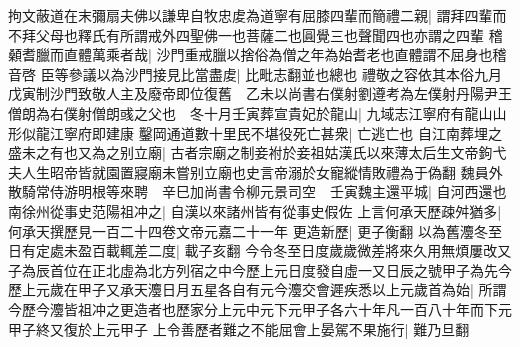 拘文蔽道在末彌扇夫佛以謙卑自牧忠䖍為道寧有屈膝四輩而簡禮二親|{
	謂拜四輩而不拜父母也釋氏有所謂戒外四聖佛一也菩薩二也圓覺三也聲聞四也亦謂之四輩}
稽顙耆臘而直體萬乘者哉|{
	沙門重戒臘以捨俗為僧之年為始耆老也直體謂不屈身也稽音啓}
臣等參議以為沙門接見比當盡䖍|{
	比毗志翻並也總也}
禮敬之容依其本俗九月戊寅制沙門致敬人主及廢帝即位復舊　乙未以尚書右僕射劉遵考為左僕射丹陽尹王僧朗為右僕射僧朗彧之父也　冬十月壬寅葬宣貴妃於龍山|{
	九域志江寧府有龍山山形似龍江寧府即建康}
鑿岡通道數十里民不堪役死亡甚衆|{
	亡逃亡也}
自江南葬埋之盛未之有也又為之别立廟|{
	古者宗廟之制妾袝於妾祖姑漢氏以來薄太后生文帝鉤弋夫人生昭帝皆就園置寢廟未嘗别立廟也史言帝溺於女寵縱情敗禮為于偽翻}
魏員外散騎常侍游明根等來聘　辛巳加尚書令柳元景司空　壬寅魏主還平城|{
	自河西還也}
南徐州從事史范陽祖冲之|{
	自漢以來諸州皆有從事史假佐}
上言何承天歷疎舛猶多|{
	何承天撰歷見一百二十四卷文帝元嘉二十一年}
更造新歷|{
	更子衡翻}
以為舊灋冬至日有定處未盈百載輒差二度|{
	載子亥翻}
今令冬至日度歲歲微差將來久用無煩屢改又子為辰首位在正北虛為北方列宿之中今歷上元日度發自虛一又日辰之號甲子為先今歷上元歲在甲子又承天灋日月五星各自有元今灋交會遲疾悉以上元歲首為始|{
	所謂今歷今灋皆祖冲之更造者也歷家分上元中元下元甲子各六十年凡一百八十年而下元甲子終又復於上元甲子}
上令善歷者難之不能屈會上晏駕不果施行|{
	難乃旦翻}


